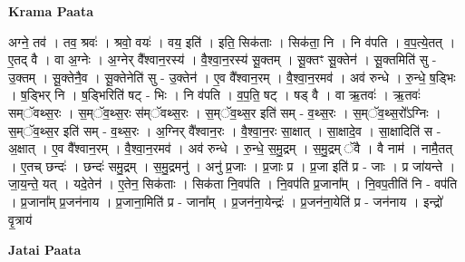\documentclass[17pt]{extarticle}
\begin{document}
\textbf{Krama Paata} \newline

अग्ने॒ तव॑ । तव॒ श्रवः॑ । श्रवो॒ वयः॑ । वय॒ इति॑ । इति॒ सिक॑ताः । सिक॑ता॒ नि । नि व॑पति । व॒प॒त्ये॒तत् । ए॒तद् वै । वा अ॒ग्नेः । अ॒ग्नेर् वै᳚श्वान॒रस्य॑ । वै॒श्वा॒न॒रस्य॑ सू॒क्तम् । सू॒क्तꣳ सू॒क्तेन॑ । सू॒क्तमिति॑ सु - उ॒क्तम् । सू॒क्तेनै॒व । सू॒क्तेनेति॑ सु - उ॒क्तेन॑ । ए॒व वै᳚श्वान॒रम् । वै॒श्वा॒न॒रमव॑ । अव॑ रुन्धे । रु॒न्धे॒ ष॒ड्भिः । ष॒ड्भिर् नि । ष॒ड्भिरिति॑ षट् - भिः । नि व॑पति । व॒प॒ति॒ षट् । षड् वै । वा ऋ॒तवः॑ । ऋ॒तवः॑ सम्ॅवथ्स॒रः । स॒म्ॅव॒थ्स॒रः स॑म्ॅवथ्स॒रः । स॒म्ॅव॒थ्स॒र इति॑ सम् - व॒थ्स॒रः । स॒म्ॅव॒थ्स॒रो᳚ऽग्निः । स॒म्ॅव॒थ्स॒र इति॑ सम् - व॒थ्स॒रः । अ॒ग्निर् वै᳚श्वान॒रः । वै॒श्वा॒न॒रः सा॒क्षात् । सा॒क्षादे॒व । सा॒क्षादिति॑ स - अ॒क्षात् । ए॒व वै᳚श्वान॒रम् । वै॒श्वा॒न॒रमव॑ । अव॑ रुन्धे । रु॒न्धे॒ स॒मु॒द्रम् । स॒मु॒द्रम् ॅवै । वै नाम॑ । नामै॒तत् । ए॒तच् छन्दः॑ । छन्दः॑ समु॒द्रम् । स॒मु॒द्रमनु॑ । अनु॑ प्र॒जाः । प्र॒जाः 
प्र । प्र॒जा इति॑ प्र - जाः । प्र जा॑यन्ते । जा॒य॒न्ते॒ यत् । यदे॒तेन॑ । ए॒तेन॒ सिक॑ताः । सिक॑ता नि॒वप॑ति । नि॒वप॑ति प्र॒जाना᳚म् । नि॒वप॒तीति॑ नि - वप॑ति । प्र॒जाना᳚म् प्र॒जन॑नाय । प्र॒जाना॒मिति॑ प्र - जाना᳚म् । प्र॒जन॑ना॒येन्द्रः॑ । प्र॒जन॑ना॒येति॑ प्र - जन॑नाय । इन्द्रो॑ वृ॒त्राय॑ \newline

\textbf{Jatai Paata} \newline
\end{document}
